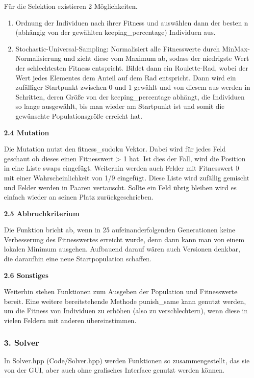 \noindent Für die Selektion existieren 2 Möglichkeiten.
\begin{enumerate}
    \item Ordnung der Individuen nach ihrer Fitness und auswählen dann der besten n (abhängig von der gewählten keeping\_percentage) Individuen aus.
    \item Stochastic-Universal-Sampling: Normalisiert alle Fitnesswerte durch MinMax-
    Normalisierung und zieht diese vom Maximum ab, sodass der niedrigste Wert der schlechtesten Fitness entspricht. Bildet dann ein Roulette-Rad, wobei der Wert jedes Elementes dem Anteil auf dem Rad entspricht. Dann wird ein zufälliger Startpunkt zwischen 0 und 1 gewählt und von diesem aus werden in Schritten, deren Größe von der keeping\_percentage abhängt, die Individuen so lange ausgewählt, bis man wieder am Startpunkt ist und somit die gewünschte Populationsgröße erreicht hat.
\end{enumerate}

\noindent\textbf{2.4 Mutation}

\noindent Die Mutation nutzt den fitness\_sudoku Vektor. Dabei wird für jedes Feld geschaut ob dieses einen Fitnesswert > 1 hat. Ist dies der Fall, wird die Position in eine Liste swaps eingefügt. Weiterhin werden auch Felder mit Fitnesswert 0 mit einer Wahrscheinlichkeit von 1/9 eingefügt. Diese Liste wird zufällig gemischt und Felder werden in Paaren vertauscht. Sollte ein Feld übrig bleiben wird es einfach wieder an seinen Platz zurückgeschrieben.

\noindent \textbf{2.5 Abbruchkriterium}

\noindent Die Funktion bricht ab, wenn in 25 aufeinanderfolgenden Generationen keine Verbesserung des Fitnesswertes erreicht wurde, denn dann kann man von einem lokalen Minimum ausgehen. Aufbauend darauf wären auch Versionen denkbar, die daraufhin eine neue Startpopulation schaffen.

\noindent \textbf{2.6 Sonstiges}

\noindent Weiterhin stehen Funktionen zum Ausgeben der Population und Fitnesswerte bereit. Eine weitere bereitstehende Methode punish\_same kann genutzt werden, um die Fitness von Individuen zu erhöhen (also zu verschlechtern), wenn diese in vielen Feldern mit anderen übereinstimmen.
\newpage
\subsubsection*{3. Solver}

In Solver.hpp (Code/Solver.hpp) werden Funktionen so zusammengestellt, das sie von der GUI, aber auch ohne grafisches Interface genutzt werden können. 

